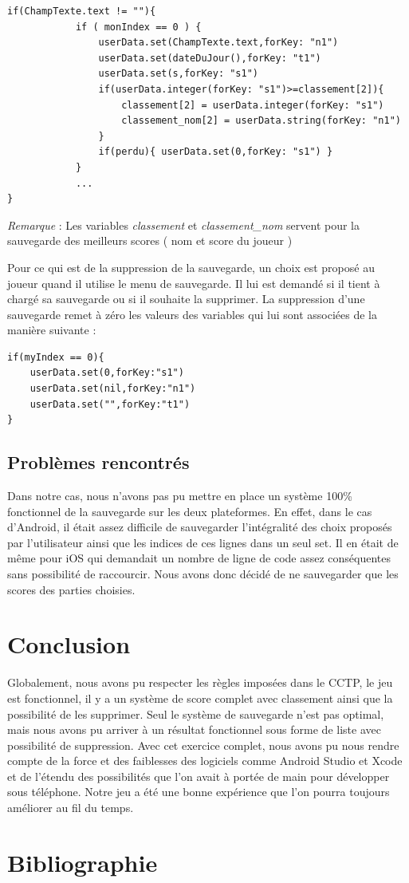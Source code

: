 \documentclass{article}
\begin{document}
\begin{verbatim}
if(ChampTexte.text != ""){
            if ( monIndex == 0 ) {
                userData.set(ChampTexte.text,forKey: "n1")
                userData.set(dateDuJour(),forKey: "t1")
                userData.set(s,forKey: "s1")
                if(userData.integer(forKey: "s1")>=classement[2]){
                    classement[2] = userData.integer(forKey: "s1")
                    classement_nom[2] = userData.string(forKey: "n1")
                }
                if(perdu){ userData.set(0,forKey: "s1") }
            }
            ...
}
\end{verbatim}

\textit{Remarque} : Les variables \textit{classement} et \textit{classement\_nom} servent pour la sauvegarde des meilleurs scores ( nom et score du joueur ) 

\bigskip
\indent Pour ce qui est de la suppression de la sauvegarde, un choix est propos\'{e} au joueur quand il utilise le menu de sauvegarde. Il lui est demand\'{e} si il tient \`{a} charg\'{e} sa sauvegarde ou si il souhaite la supprimer. La suppression d'une sauvegarde remet \`{a} z\'{e}ro les valeurs des variables qui lui sont associ\'{e}es de la mani\`{e}re suivante : 

\begin{verbatim}
if(myIndex == 0){
	userData.set(0,forKey:"s1")
	userData.set(nil,forKey:"n1")
	userData.set("",forKey:"t1")
}
\end{verbatim}

\subsection{Problèmes rencontrés}
Dans notre cas, nous n'avons pas pu mettre en place un système 100\% fonctionnel de la sauvegarde sur les deux plateformes. En effet, dans le cas d'Android, il était assez difficile de sauvegarder l'intégralité des choix proposés par l'utilisateur ainsi que les indices de ces lignes dans un seul set. 
Il en était de même pour iOS qui demandait un nombre de ligne de code assez conséquentes sans possibilité de raccourcir.
Nous avons donc décidé de ne sauvegarder que les scores des parties choisies.


\section{Conclusion}

Globalement, nous avons pu respecter les règles imposées dans le CCTP, le jeu est fonctionnel, il y a un système de score complet avec classement ainsi que la possibilité de les supprimer. Seul le système de sauvegarde n'est pas optimal, mais nous avons pu arriver à un résultat fonctionnel sous forme de liste avec possibilité de suppression. 
Avec cet exercice complet, nous avons pu nous rendre compte de la force et des faiblesses des logiciels comme Android Studio et Xcode et de l'étendu des possibilités que l'on avait à portée de main pour développer sous téléphone.
Notre jeu a été une bonne expérience que l'on pourra toujours améliorer au fil du temps.

\section{Bibliographie}
\nocite{*} 


\end{document}
